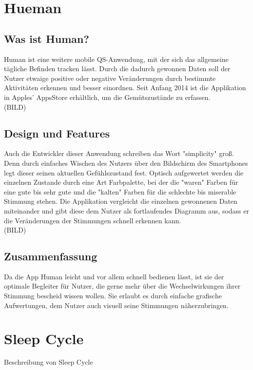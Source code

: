 \section{Hueman}
\label{ch:Apps:sec:Hueman}

\subsection{Was ist Human?}
\label{ch:Apps:sec:Moves:subsec:WIH}

Human ist eine weitere mobile QS-Anwendung, mit der sich das allgemeine tägliche Befinden tracken lässt. 
Durch die dadurch gewonnen Daten soll der Nutzer etwaige positive oder negative Veränderungen durch bestimmte Aktivitäten erkennen und besser einordnen.
Seit Anfang 2014 ist die Applikation in Apples' AppsStore erhältlich, um die Gemütszustände zu erfassen.
\\
(BILD)

\subsection{Design und Features}
\label{ch:Apps:sec:Moves:subsec:DuFe}

Auch die Entwickler dieser Anwendung schreiben das Wort "simplicity" groß. 
Denn durch einfaches Wischen des Nutzers über den Bildschirm des Smartphones legt dieser seinen aktuellen Gefühlszustand fest.
Optisch aufgewertet werden die einzelnen Zustande durch eine Art Farbpalette, bei der die "waren" Farben für eine gute bis sehr gute und die "kalten" Farben für die schlechte bis miserable Stimmung stehen.
Die Applikation vergleicht die einzelnen gewonnenen Daten miteinander und gibt diese dem Nutzer als fortlaufendes Diagramm aus, sodass er die Veränderungen der Stimmungen schnell erkennen kann.
\\
(BILD)

\subsection{Zusammenfassung}
\label{ch:Apps:sec:Moves:subsec:Verdict}

Da die App Human leicht und vor allem schnell bedienen lässt, ist sie der optimale Begleiter für Nutzer, die gerne mehr über die Wechselwirkungen ihrer Stimmung bescheid wissen wollen.
Sie erlaubt es durch einfache grafische Aufwertungen, dem Nutzer auch visuell seine Stimmungen näherzubringen.  


\section{Sleep Cycle}
\label{ch:Apps:sec:SleepCycle}

Beschreibung von Sleep Cycle


